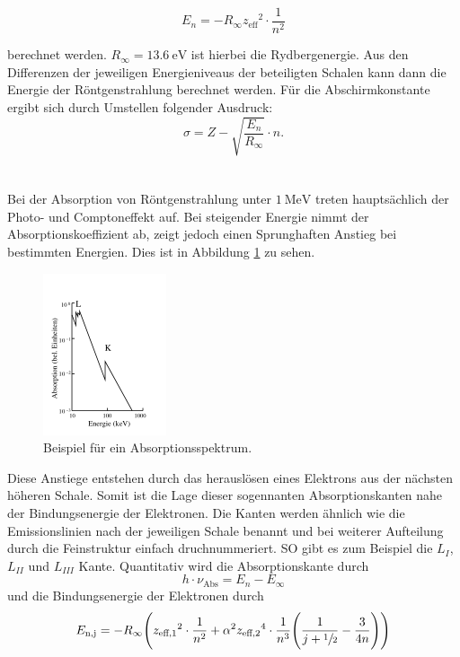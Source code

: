 \begin{equation}
  E_n = - R_{\infty} {z_\text{eff}}^2 \cdot \frac{1}{n^2}
  \label{eqn:En}
\end{equation}

berechnet werden. $R_{\infty} = \SI{13.6}{\electronvolt}$ ist hierbei die Rydbergenergie. Aus den Differenzen der jeweiligen Energieniveaus der beteiligten Schalen kann dann die
Energie der Röntgenstrahlung berechnet werden.
Für die Abschirmkonstante ergibt sich durch Umstellen folgender Ausdruck:
\begin{equation}
  \sigma = Z-\sqrt{\frac{E_n}{R_{\infty}}}\cdot n .
  \label{eqn:sigma}
\end{equation} \\\\
Bei der Absorption von Röntgenstrahlung unter $\SI{1}{\mega\electronvolt}$ treten hauptsächlich der Photo- und Comptoneffekt auf. Bei steigender Energie nimmt der Absorptionskoeffizient
ab, zeigt jedoch einen Sprunghaften Anstieg bei bestimmten Energien. Dies ist in Abbildung \ref{fig:absorption} zu sehen.
\begin{figure}
  \centering
  \includegraphics{images/absorption.png}
  \caption{Beispiel für ein Absorptionsspektrum.\cite{sample}}
  \label{fig:absorption}
\end{figure}
Diese Anstiege entstehen durch das herauslösen eines Elektrons aus der nächsten höheren Schale.
Somit ist die Lage dieser sogennanten Absorptionskanten nahe der Bindungsenergie der Elektronen. Die Kanten werden ähnlich wie die Emissionslinien nach der jeweiligen Schale
benannt und bei weiterer Aufteilung durch die Feinstruktur einfach druchnummeriert. SO gibt es zum Beispiel die $L_I$, $L_{II}$ und $L_{III}$ Kante. Quantitativ wird
die Absorptionskante durch
\begin{equation}
  h \cdot {\nu}_\text{Abs} = E_n - E_{\infty}
  \label{eqn:kante}
\end{equation}
und die Bindungsenergie der Elektronen durch
\begin{equation}
  E_\text{n,j} = - R_{\infty} \Biggl({z_\text{eff,1}}^2 \cdot \frac{1}{n^2} + {\alpha}^2 {z_\text{eff,2}}^4 \cdot \frac{1}{n^3} \Biggl(\frac{1}{j+\sfrac{1}{2}} - \frac{3}{4n} \Biggr) \Biggr)
  \label{eqn:feinstruktur}
\end{equation}
